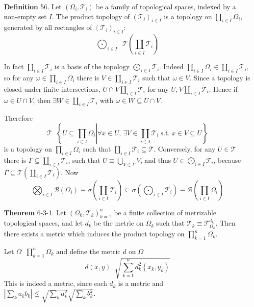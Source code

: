 \documentclass[a4paper]{article}
\newcommand{\obj}[1]{\left\{ #1 \right \}}
\newcommand{\brac}[1]{\left ( #1 \right )}
\newcommand{\induc}[1]{\left . #1 \right \vert}
\newcommand{\abs}[1]{\left | #1 \right |}
\newcommand{\Tcal}{\mathcal{T}}
\newcommand{\borel}[1]{\mathcal{B}\brac{#1}}
\newcommand{\defn}{\mathop{\overset{\Delta}{=}}\nolimits}
\begin{document}
\noindent \textbf{Definition} 56.
Let $\brac{\Omega_i, \Tcal_i}$ be a family of topological spaces, indexed by a non-empty set $I$. The product topology of $\brac{\Tcal_i}_{i\in I}$ is a topology on $\prod_{i\in I} \Omega_i$, generated by all rectangles of $\brac{\Tcal_i}_{i\in I}$: \[\bigodot_{i\in I} \defn \Tcal\brac{ \coprod_{i\in I} \Tcal_i }\]

In fact $\coprod_{i\in I} \Tcal_i$ is a basis of the topology $\bigodot_{i\in I} \Tcal_i$. Indeed $\prod_{i\in I}\Omega_i\in \coprod_{i\in I} \Tcal_i$, so for any $\omega\in \prod_{i\in I}\Omega_i$ there is $V\in \coprod_{i\in I} \Tcal_i$ such that $\omega\in V$. Since a topology is closed under finite intersections, $U\cap V \coprod_{i\in I} \Tcal_i$ for any $U, V \coprod_{i\in I} \Tcal_i$. Hence if $\omega\in U\cap V$, then $\exists W\in \coprod_{i\in I} \Tcal_i$ with $\omega\in W\subseteq U\cap V$.

Therefore \[\Tcal \defn \obj{ \induc{ U\subseteq \prod_{i\in I} \Omega_i } \forall x\in U,\, \exists V\in \coprod_{i\in I}\Tcal_i\;\text{s.t.}\; x\in V\subseteq U } \] is a topology on $\prod_{i\in I} \Omega_i$ such that $\coprod_{i\in I} \Tcal_i \subseteq \Tcal$. Conversely, for any $U\in \Tcal$ there is $\Gamma \subseteq \coprod_{i\in I} \Tcal_i$, such that $U \equiv \bigcup_{V\in \Gamma} V$, and thus $U\in \bigodot_{i\in I} \Tcal_i$, because $\Gamma \subseteq \Tcal\brac{\coprod_{i\in I} \Tcal_i}$. Now \[\bigotimes_{i\in I} \borel{\Omega_i} \equiv \sigma\brac{\coprod_{i\in I} \Tcal_i}\subseteq \sigma\brac{\bigodot_{i\in I} \Tcal_i} \equiv \borel{\prod_{i\in I} \Omega_i}\]

\label{thm:fin_prod_space_metr} \noindent \textbf{Theorem} 6-3-1.
Let $\brac{\Omega_k, \Tcal_k}_{k=1}^n$ be a finite collection of metrizable topological spaces, and let $d_k$ be the metric on $\Omega_k$ such that $\Tcal_k \equiv \Tcal_{\Omega_k}^{d_k}$. Then there exists a metric which induces the product topology on $\prod_{k=1}^n\Omega_k$. %

Let $\Omega \defn \prod_{k=1}^n\Omega_k$ and define the metric $d$ on $\Omega$ \[d\brac{x,y} \defn \sqrt{ \sum_{k=1}^n d^2_k\brac{x_k, y_k} }\] This is indeed a metric, since each $d_k$ is a metric and $\abs{\sum_k a_k b_k} \leq \sqrt{\sum_k a_k^2 }\sqrt{\sum_k b_k^2}$.
\end{document}

